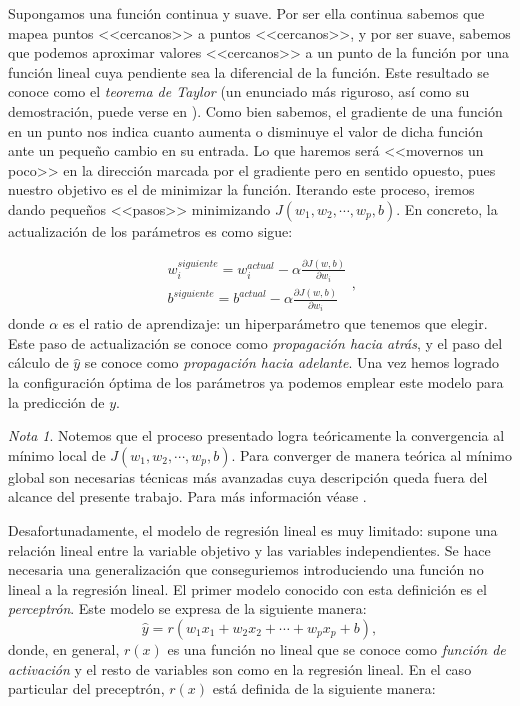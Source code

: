 \documentclass[12pt, a4paper, twoside]{book}
\numberwithin{equation}{section}
\theoremstyle{definition}
\theoremstyle{remark}
\newtheorem*{remark}{Nota}
\theoremstyle{plain}
\begin{document}
	Supongamos una función continua y suave. Por ser ella continua sabemos
	que mapea puntos <<cercanos>> a puntos <<cercanos>>, y por ser suave,
	sabemos que podemos aproximar valores <<cercanos>> a un punto de la 
	función por una función lineal cuya pendiente sea la diferencial de la 
	función. Este resultado se conoce como el \emph{teorema de Taylor} (un 
	enunciado más riguroso, así como su demostración, puede verse en 
	\cite{Diferencial-Bello}). 
	Como bien sabemos, el gradiente de una función en un punto 
	nos indica cuanto aumenta o disminuye el valor 
	de dicha función ante un pequeño cambio en su entrada. Lo que haremos 
	será <<movernos un poco>> en la dirección marcada por el gradiente 
	pero en sentido opuesto, pues nuestro objetivo 
	es el de minimizar la función. Iterando este proceso,
	iremos dando pequeños <<pasos>> minimizando $J(w_{1},w_{2},\cdots,
	w_{p},b)$. En concreto, la 
	actualización de los parámetros es como sigue:
	
	\begin{equation*}
	\begin{array}{c}
		w_{i}^{siguiente}=w_{i}^{actual}-\alpha\frac{\partial J(w,b)}
		{\partial w_{i}}\\
		b^{siguiente}=b^{actual}-\alpha\frac{\partial J(w,b)}
		{\partial w_{i}}
	\end{array},
	\end{equation*}
	donde $\alpha$ es el ratio de aprendizaje: un hiperparámetro que 
	tenemos que elegir. Este paso de actualización se conoce como 
	\emph{propagación hacia atrás}, y el paso del cálculo de $\hat{y}$ se 
	conoce como \emph{propagación hacia adelante}. Una vez hemos logrado 
	la 
	configuración óptima de los parámetros ya podemos emplear este modelo 
	para la predicción de $y$.
	
	\begin{remark}
	Notemos que el proceso presentado logra teóricamente la convergencia 
	al mínimo local de $J(w_{1},w_{2},\cdots,w_{p},b)$. Para converger de 
	manera teórica al 
	mínimo global son necesarias técnicas más avanzadas cuya descripción 
	queda fuera del alcance del presente trabajo. Para más información 
	véase \cite{Goodfellow-et-al-2016}.
	\end{remark}

	Desafortunadamente, el modelo de regresión lineal es muy limitado: 
	supone una relación lineal entre la variable objetivo y las variables
	independientes. Se hace necesaria una generalización que conseguriemos
	introduciendo una función no lineal a la regresión lineal. El primer
	modelo conocido con esta definición es el \emph{perceptrón}. Este 
	modelo se expresa de la siguiente manera:
	\begin{equation*}
		\hat{y}=r(w_{1}x_{1}+w_{2}x_{2}+\cdots+w_{p}x_{p}+b),
	\end{equation*}
	donde, en general, $r(x)$ es una función no lineal que se conoce como 
	\emph{función de activación} y el resto de variables son como en la 
	regresión lineal. En el caso particular del preceptrón, $r(x)$ está 
	definida de la siguiente manera:
	
\end{document}
